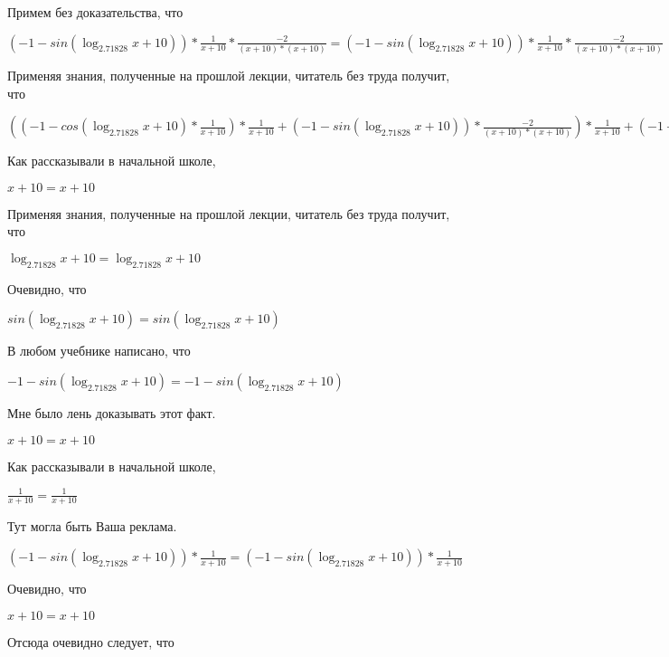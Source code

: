 \documentclass[12pt,a4paper,fleqn]{article}
\theoremstyle{definition}
\begin{document}
Примем без доказательства, что 

$( -1  - sin(\log_{ 2.71828 }{ x  +  10 })) * \frac{ 1 }{ x  +  10 }
 * \frac{ -2 }{( x  +  10 ) * ( x  +  10 )}
 = ( -1  - sin(\log_{ 2.71828 }{ x  +  10 })) * \frac{ 1 }{ x  +  10 }
 * \frac{ -2 }{( x  +  10 ) * ( x  +  10 )}
$

Применяя знания, полученные на прошлой лекции, читатель без труда получит, что 

$(( -1  - cos(\log_{ 2.71828 }{ x  +  10 }) * \frac{ 1 }{ x  +  10 }
) * \frac{ 1 }{ x  +  10 }
 + ( -1  - sin(\log_{ 2.71828 }{ x  +  10 })) * \frac{ -2 }{( x  +  10 ) * ( x  +  10 )}
) * \frac{ 1 }{ x  +  10 }
 + ( -1  - sin(\log_{ 2.71828 }{ x  +  10 })) * \frac{ 1 }{ x  +  10 }
 * \frac{ -2 }{( x  +  10 ) * ( x  +  10 )}
 = (( -1  - cos(\log_{ 2.71828 }{ x  +  10 }) * \frac{ 1 }{ x  +  10 }
) * \frac{ 1 }{ x  +  10 }
 + ( -1  - sin(\log_{ 2.71828 }{ x  +  10 })) * \frac{ -2 }{( x  +  10 ) * ( x  +  10 )}
) * \frac{ 1 }{ x  +  10 }
 + ( -1  - sin(\log_{ 2.71828 }{ x  +  10 })) * \frac{ 1 }{ x  +  10 }
 * \frac{ -2 }{( x  +  10 ) * ( x  +  10 )}
$

Как рассказывали в начальной школе, 

$ x  +  10  =  x  +  10 $

Применяя знания, полученные на прошлой лекции, читатель без труда получит, что 

$\log_{ 2.71828 }{ x  +  10 } = \log_{ 2.71828 }{ x  +  10 }$

Очевидно, что 

$sin(\log_{ 2.71828 }{ x  +  10 }) = sin(\log_{ 2.71828 }{ x  +  10 })$

В любом учебнике написано, что 

$ -1  - sin(\log_{ 2.71828 }{ x  +  10 }) =  -1  - sin(\log_{ 2.71828 }{ x  +  10 })$

Мне было лень доказывать этот факт.

$ x  +  10  =  x  +  10 $

Как рассказывали в начальной школе, 

$\frac{ 1 }{ x  +  10 }
 = \frac{ 1 }{ x  +  10 }
$

Тут могла быть Ваша реклама. 

$( -1  - sin(\log_{ 2.71828 }{ x  +  10 })) * \frac{ 1 }{ x  +  10 }
 = ( -1  - sin(\log_{ 2.71828 }{ x  +  10 })) * \frac{ 1 }{ x  +  10 }
$

Очевидно, что 

$ x  +  10  =  x  +  10 $

Отсюда очевидно следует, что 
\end{document}
